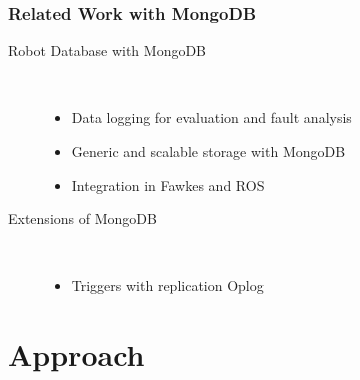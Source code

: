 \begin{frame}
  \frametitle{Related Work with MongoDB}
  \begin{description}
  \item[Robot Database with MongoDB~\cite{RoboDB}]%
                \hfill \\
    \begin{itemize}
    \item Data logging for evaluation and fault analysis
    \item Generic and scalable storage with MongoDB
    \item Integration in Fawkes and ROS
    \end{itemize}
\bigskip
  \item[Extensions of  MongoDB]%
                \hfill \\
    \begin{itemize}
    \item Triggers with replication Oplog~\cite{mongodb-trigger}
    \end{itemize}
  \end{description}
\end{frame}


\section{Approach}


